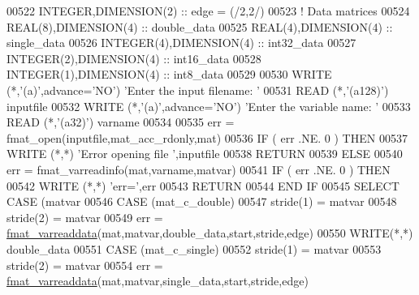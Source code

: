 \begin{DoxyCode}
{00522         \textcolor{keywordtype}{INTEGER},\textcolor{keywordtype}{DIMENSION(2)} :: edge   = (/2,2/)
00523         \textcolor{comment}{! Data matrices}
00524         \textcolor{keywordtype}{REAL(8)},\textcolor{keywordtype}{DIMENSION(4)}      :: double\_data
00525         \textcolor{keywordtype}{REAL(4)},\textcolor{keywordtype}{DIMENSION(4)}      :: single\_data
00526         \textcolor{keywordtype}{INTEGER(4)},\textcolor{keywordtype}{DIMENSION(4)}   :: int32\_data
00527         \textcolor{keywordtype}{INTEGER(2)},\textcolor{keywordtype}{DIMENSION(4)}   :: int16\_data
00528         \textcolor{keywordtype}{INTEGER(1)},\textcolor{keywordtype}{DIMENSION(4)}   :: int8\_data
00529 
00530         \textcolor{keyword}{WRITE} (*,\textcolor{stringliteral}{'(a)'},advance=\textcolor{stringliteral}{'NO'}) \textcolor{stringliteral}{'Enter the input filename: '}
00531         \textcolor{keyword}{READ} (*,\textcolor{stringliteral}{'(a128)'}) inputfile
00532         \textcolor{keyword}{WRITE} (*,\textcolor{stringliteral}{'(a)'},advance=\textcolor{stringliteral}{'NO'}) \textcolor{stringliteral}{'Enter the variable name: '}
00533         \textcolor{keyword}{READ} (*,\textcolor{stringliteral}{'(a32)'}) varname
00534 
00535         err = fmat\_open(inputfile,mat\_acc\_rdonly,mat)
00536         \textcolor{keywordflow}{IF} ( err .NE. 0 ) \textcolor{keywordflow}{THEN}
00537             \textcolor{keyword}{WRITE} (*,*) \textcolor{stringliteral}{'Error opening file '},inputfile
00538             \textcolor{keywordflow}{RETURN}
00539         \textcolor{keywordflow}{ELSE}
00540             err = fmat\_varreadinfo(mat,varname,matvar)
00541             \textcolor{keywordflow}{IF} ( err .NE. 0 ) \textcolor{keywordflow}{THEN}
00542                 \textcolor{keyword}{WRITE} (*,*) \textcolor{stringliteral}{'err='},err
00543                 \textcolor{keywordflow}{RETURN}
00544 \textcolor{keywordflow}{            END IF}
00545             \textcolor{keywordflow}{SELECT CASE} (matvar%
00546                 \textcolor{keywordflow}{CASE} (mat\_c\_double)
00547                     stride(1) = matvar%
00548                     stride(2) = matvar%
00549                     err = \hyperlink{interfacematio_1_1fmat__varreaddata}{fmat\_varreaddata}(mat,matvar,double\_data,start,stride,edge)
00550                     \textcolor{keyword}{WRITE}(*,*) double\_data
00551                 \textcolor{keywordflow}{CASE} (mat\_c\_single)
00552                     stride(1) = matvar%
00553                     stride(2) = matvar%
00554                     err = \hyperlink{interfacematio_1_1fmat__varreaddata}{fmat\_varreaddata}(mat,matvar,single\_data,start,stride,edge)
}
\end{DoxyCode}
